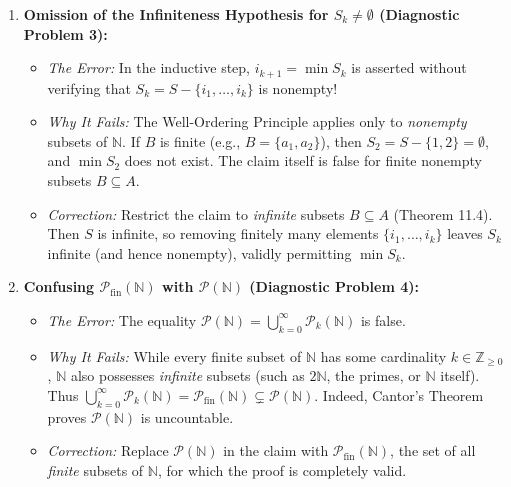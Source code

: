 \documentclass[11pt, letterpaper]{article}
\theoremstyle{definition}
\theoremstyle{remark}
\begin{document}
\begin{enumerate}[label=\textbf{Flaw \arabic*:}]
    \item \textbf{Omission of the Infiniteness Hypothesis for $S_k \neq \emptyset$ (Diagnostic Problem 3):}
    \begin{itemize}
        \item \textit{The Error:} In the inductive step, $i_{k+1} = \min S_k$ is asserted without verifying that $S_k = S - \{i_1, \dots, i_k\}$ is nonempty!
        \item \textit{Why It Fails:} The Well-Ordering Principle applies only to \textit{nonempty} subsets of $\mathbb{N}$. If $B$ is finite (e.g., $B = \{a_1, a_2\}$), then $S_2 = S - \{1, 2\} = \emptyset$, and $\min S_2$ does not exist. The claim itself is false for finite nonempty subsets $B \subseteq A$.
        \item \textit{Correction:} Restrict the claim to \textit{infinite} subsets $B \subseteq A$ (Theorem 11.4). Then $S$ is infinite, so removing finitely many elements $\{i_1, \dots, i_k\}$ leaves $S_k$ infinite (and hence nonempty), validly permitting $\min S_k$.
    \end{itemize}

    \item \textbf{Confusing $\mathcal{P}_{\mathrm{fin}}(\mathbb{N})$ with $\mathcal{P}(\mathbb{N})$ (Diagnostic Problem 4):}
    \begin{itemize}
        \item \textit{The Error:} The equality $\mathcal{P}(\mathbb{N}) = \bigcup_{k=0}^\infty \mathcal{P}_k(\mathbb{N})$ is false.
        \item \textit{Why It Fails:} While every finite subset of $\mathbb{N}$ has some cardinality $k \in \mathbb{Z}_{\geq 0}$, $\mathbb{N}$ also possesses \textit{infinite} subsets (such as $2\mathbb{N}$, the primes, or $\mathbb{N}$ itself). Thus $\bigcup_{k=0}^\infty \mathcal{P}_k(\mathbb{N}) = \mathcal{P}_{\mathrm{fin}}(\mathbb{N}) \subsetneq \mathcal{P}(\mathbb{N})$. Indeed, Cantor's Theorem proves $\mathcal{P}(\mathbb{N})$ is uncountable.
        \item \textit{Correction:} Replace $\mathcal{P}(\mathbb{N})$ in the claim with $\mathcal{P}_{\mathrm{fin}}(\mathbb{N})$, the set of all \textit{finite} subsets of $\mathbb{N}$, for which the proof is completely valid.
    \end{itemize}


\end{enumerate}
\end{document}
